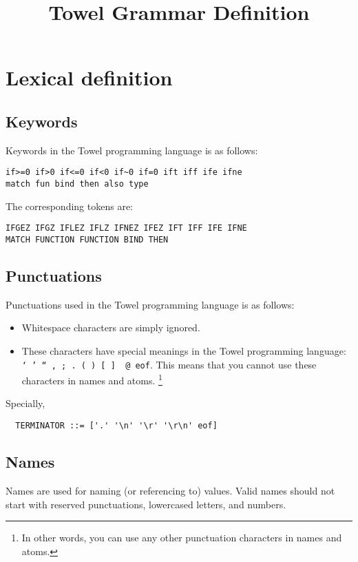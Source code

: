 \documentclass{article}
\title{Towel Grammar Definition}
\begin{document}
\maketitle
\tableofcontents

\section{Lexical definition}

\subsection{Keywords}

Keywords in the Towel programming language is as follows:
\begin{verbatim}
if>=0 if>0 if<=0 if<0 if~0 if=0 ift iff ife ifne
match fun bind then also type
\end{verbatim}

The corresponding tokens are:
\begin{verbatim}
IFGEZ IFGZ IFLEZ IFLZ IFNEZ IFEZ IFT IFF IFE IFNE
MATCH FUNCTION FUNCTION BIND THEN
\end{verbatim}

\subsection{Punctuations}

Punctuations used in the Towel programming language is as follows:

\begin{itemize}
\item Whitespace characters are simply ignored.
\item These characters have special meanings in the Towel programming language: \texttt{` ' `` , ; . ( ) [ ] \ @ eof}. This means that you cannot use these characters in names and atoms. \footnote{In other words, you can use any other punctuation characters in names and atoms.}
\end{itemize}

Specially,
\begin{verbatim}
  TERMINATOR ::= ['.' '\n' '\r' '\r\n' eof]
\end{verbatim}

\subsection{Names}

Names are used for naming (or referencing to) values. Valid names should not start with reserved punctuations, lowercased letters, and numbers.
\end{document}
